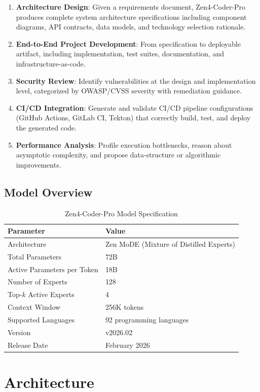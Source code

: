 \documentclass[11pt,a4paper]{article}
\begin{document}
\begin{enumerate}
  \item \textbf{Architecture Design}: Given a requirements document, Zen4-Coder-Pro produces complete system architecture specifications including component diagrams, API contracts, data models, and technology selection rationale.
  \item \textbf{End-to-End Project Development}: From specification to deployable artifact, including implementation, test suites, documentation, and infrastructure-as-code.
  \item \textbf{Security Review}: Identify vulnerabilities at the design and implementation level, categorized by OWASP/CVSS severity with remediation guidance.
  \item \textbf{CI/CD Integration}: Generate and validate CI/CD pipeline configurations (GitHub Actions, GitLab CI, Tekton) that correctly build, test, and deploy the generated code.
  \item \textbf{Performance Analysis}: Profile execution bottlenecks, reason about asymptotic complexity, and propose data-structure or algorithmic improvements.
\end{enumerate}

\subsection{Model Overview}

\begin{table}[H]
\centering
\caption{Zen4-Coder-Pro Model Specification}
\begin{tabular}{ll}
\toprule
\textbf{Parameter} & \textbf{Value} \\
\midrule
Architecture & Zen MoDE (Mixture of Distilled Experts) \\
Total Parameters & 72B \\
Active Parameters per Token & 18B \\
Number of Experts & 128 \\
Top-$k$ Active Experts & 4 \\
Context Window & 256K tokens \\
Supported Languages & 92 programming languages \\
Version & v2026.02 \\
Release Date & February 2026 \\
\bottomrule
\end{tabular}
\end{table}

\section{Architecture}
\end{document}
